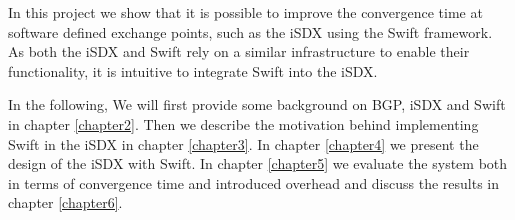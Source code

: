 In this project we show that it is possible to improve the convergence time at software defined exchange points, such as the iSDX using the Swift framework. As both the iSDX and Swift rely on a similar infrastructure to enable their functionality, it is intuitive to integrate Swift into the iSDX. 

In the following, We will first provide some background on BGP, iSDX and Swift in chapter \ref{chapter2}. Then we describe the motivation behind implementing Swift in the iSDX in chapter \ref{chapter3}. In chapter \ref{chapter4} we present the design of the iSDX with Swift. In chapter \ref{chapter5} we evaluate the system both in terms of convergence time and introduced overhead and discuss the results in chapter \ref{chapter6}. 



